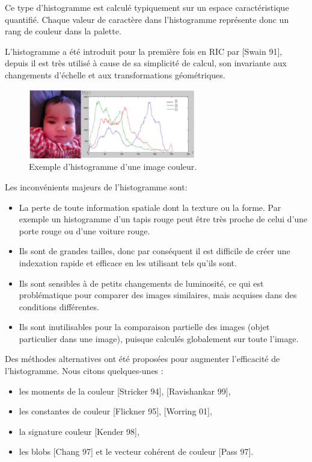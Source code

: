 Ce type d'histogramme est calculé typiquement sur un espace caractéristique quantifié. Chaque valeur de caractère dans l'histogramme représente donc un rang de couleur dans la
palette. 

L'histogramme a été introduit pour la première fois en RIC par [Swain 91], depuis il est très utilisé à cause de sa simplicité de calcul, son invariante aux changements d'échelle et aux transformations géométriques.\\

\begin{figure}[H]
	\label{fig:hist}
	\centering
	\includegraphics[width=0.65\textwidth]{Figures/hist} %
	\caption{Exemple d’histogramme d’une image couleur.}
\end{figure}

Les inconvénients majeurs de l'histogramme sont:
\begin{itemize}
	\item La perte de toute information spatiale dont la texture ou la forme. Par exemple un histogramme d'un tapis rouge peut être très proche de celui d'une porte rouge ou d'une voiture rouge.
	
	\item Ils sont de grandes tailles, donc par conséquent il est difficile de créer une indexation rapide et efficace en les utilisant tels qu'ils sont. 
	
	\item Ils sont sensibles à de petits changements de luminosité, ce qui est problématique pour comparer des images similaires, mais acquises dans des conditions différentes. 
	
	\item Ils sont inutilisables pour la comparaison partielle des images (objet particulier dans une image), puisque calculés globalement sur toute l’image.
	
\end{itemize}
   Des méthodes alternatives ont été proposées pour augmenter l'efficacité de l'histogramme. Nous citons quelques-unes : 
\begin{itemize}
	\item les moments de la couleur [Stricker 94], [Ravishankar 99],
	\item les constantes de couleur [Flickner 95], [Worring 01],
	\item la signature couleur [Kender 98], 
	\item les blobs [Chang 97] et le vecteur cohérent de couleur [Pass 97].\\
\end{itemize}

